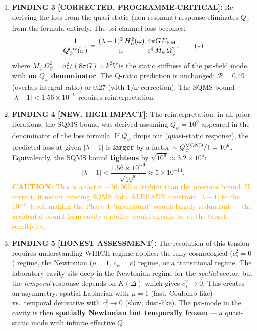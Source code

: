 \documentclass[11pt]{article}
\newcommand{\lbone}{|\lambda - 1|}
\newcommand{\Qpsi}{Q_\psi}
\newcommand{\ee}[1]{\times 10^{#1}}
\newcommand{\Opsi}{\Omega_\psi}
\newcommand{\Mpsi}{M_\psi}
\newcommand{\Heff}{H_n}
\newcommand{\caution}[1]{\textcolor{orange}{\textbf{CAUTION:} #1}}
\theoremstyle{definition}
\theoremstyle{remark}
\begin{document}
\begin{tcolorbox}[colback=blue!5!white, colframe=blue!60!black,
  title=\textbf{W4i16 --- $Q_\psi$ LOCAL vs GLOBAL: RESOLUTION}]
\begin{enumerate}[nosep]
\item \textbf{FINDING 3 [CORRECTED, PROGRAMME-CRITICAL]:} Re-deriving
  the loss from the quasi-static (non-resonant) response eliminates
  $\Qpsi$ from the formula entirely. The psi-channel loss becomes:
  \begin{equation}
  \frac{1}{Q_\psi^{\rm cav}(\omega)} =
  \frac{(\lambda - 1)^2\,\Heff^2(\omega)}
  {\omega}\,\frac{4\pi G\,U_{\rm EM}}{c^4\,\Mpsi\,\Opsi^2},
  \tag{$\star$}
  \end{equation}
  where $\Mpsi\,\Opsi^2 = a_*^2/(8\pi G) \times k^2 V$ is the
  static stiffness of the psi-field mode, with \textbf{no $\Qpsi$
  denominator}. The Q-ratio prediction is unchanged: $\mathcal{R}
  = 0.49$ (overlap-integral ratio) or $0.27$ (with $1/\omega$
  correction). The SQMS bound $\lbone < 1.56\ee{-9}$ requires
  reinterpretation.

\item \textbf{FINDING 4 [NEW, HIGH IMPACT]:} The reinterpretation:
  in all prior iterations, the SQMS bound was derived assuming
  $\Qpsi = 10^9$ appeared in the denominator of the loss formula.
  If $\Qpsi$ drops out (quasi-static response), the predicted
  loss at given $\lbone$ is \textbf{larger} by a factor $\sim
  \Qpsi^{\rm MOND}/1 = 10^9$. Equivalently, the SQMS bound
  \textbf{tightens} by $\sqrt{10^9} \approx 3.2\ee{4}$:
  \begin{equation}
  \lbone < \frac{1.56\ee{-9}}{\sqrt{10^9}} \approx 5\ee{-14}.
  \tag{$\star\star$}
  \end{equation}
  \caution{This is a factor $\sim 30{,}000\times$ tighter than the
  previous bound. If correct, it means existing SQMS data ALREADY
  constrain $\lbone$ to the $10^{-14}$ level, making the Phase~I
  ``intentional'' search largely redundant --- the accidental bound
  from cavity stability would already be at the target sensitivity.}

\item \textbf{FINDING 5 [HONEST ASSESSMENT]:} The resolution of this
  tension requires understanding WHICH regime applies: the fully
  cosmological ($c_s^2 = 0$) regime, the Newtonian ($\mu = 1$,
  $c_\psi = c$) regime, or a transitional regime. The laboratory
  cavity sits deep in the Newtonian regime for the \emph{spatial}
  sector, but the \emph{temporal} response depends on $K(\Delta)$
  which gives $c_s^2 \to 0$. This creates an asymmetry: spatial
  Laplacian with $\mu = 1$ (fast, Coulomb-like) vs.\ temporal
  derivative with $c_s^2 \to 0$ (slow, dust-like). The psi-mode
  in the cavity is then \textbf{spatially Newtonian but temporally
  frozen} --- a quasi-static mode with infinite effective $Q$.
\end{enumerate}


\end{tcolorbox}
\end{document}
